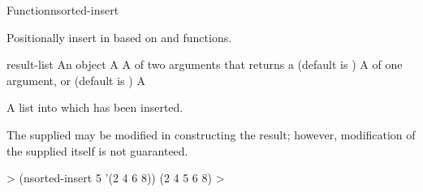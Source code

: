 \documentclass[10pt,twoside,english,pdftex]{article}
\begin{document}
\begin{functiondoc}{Function}{nsorted-insert}{
      
    \returns{} } 
%
%
  
\fnsyntax

\fnpurpose Positionally insert  in  based on
 and  functions.

\fnpackage {}

\fnmodule {}

\fnargs
\begin{args}{result-list}
\arg[item] An object
\arg[list] A 
\arg[predicate] A  of two arguments that returns a
 (default is )
\arg[key] A  of one argument, or \nil{} (default is \nil)
 A 
\end{args}

\fnreturns A list into which  has been inserted.

\fndescription The supplied  may be modified in
constructing the result; however, modification of the supplied
 itself is not guaranteed.

\fnexample
%
\W\supp
\begin{example}
  > (nsorted-insert 5 '(2 4 6 8))
  (2 4 5 6 8)
  >
\end{example}

\end{functiondoc}

\end{document}
